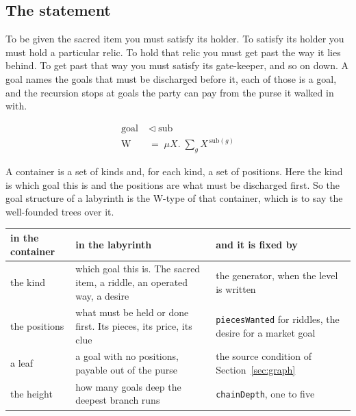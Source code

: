 \documentclass[11pt,a4paper]{article}
\begin{document}
\subsection{The statement}

To be given the sacred item you must satisfy its holder. To satisfy its holder you must hold a
particular relic. To hold that relic you must get past the way it lies behind. To get past that way
you must satisfy its gate-keeper, and so on down. A goal names the goals that must be discharged
before it, each of those is a goal, and the recursion stops at goals the party can pay from the
purse it walked in with.

\begin{center}
\begin{tcolorbox}[plainbg, colback=pale, width=0.9\textwidth]
\begin{align*}
\text{goal} \;&\lhd\; \text{sub} \\
\mathrm{W} \;&=\; \mu X.\; \textstyle\sum_{g} X^{\,\text{sub}(g)}
\end{align*}
\end{tcolorbox}
\end{center}

A container is a set of kinds and, for each kind, a set of positions. Here the kind is which goal
this is and the positions are what must be discharged first. So the goal structure of a labyrinth
is the W-type of that container, which is to say the well-founded trees over it.

\begin{center}
\begin{tabular}{@{}l@{\hspace{4mm}}>{\raggedright\arraybackslash}p{}@{\hspace{4mm}}>{\raggedright\arraybackslash}p{}@{}}
\toprule
\textbf{in the container} & \textbf{in the labyrinth} & \textbf{and it is fixed by} \\
\midrule
the kind      & which goal this is. The sacred item, a riddle, an operated way, a desire &
the generator, when the level is written \\[1mm]
the positions & what must be held or done first. Its pieces, its price, its clue &
\texttt{piecesWanted} for riddles, the desire for a market goal \\[1mm]
a leaf        & a goal with no positions, payable out of the purse &
the source condition of Section~\ref{sec:graph} \\[1mm]
the height    & how many goals deep the deepest branch runs &
\texttt{chainDepth}, one to five \\
\bottomrule
\end{tabular}
\end{center}
\end{document}
